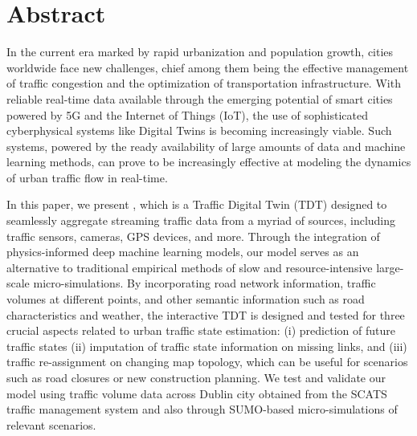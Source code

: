 \newpage
\chapter*{\centering Abstract}
{
In the current era marked by rapid urbanization and population growth, cities worldwide face new challenges, chief among them being the effective management of traffic congestion and the optimization of transportation infrastructure. With reliable real-time data available through the emerging potential of smart cities powered by 5G and the Internet of Things (IoT), the use of sophisticated cyberphysical systems like Digital Twins is becoming increasingly viable. Such systems, powered by the ready availability of large amounts of data and machine learning methods, can prove to be increasingly effective at modeling the dynamics of urban traffic flow in real-time.

In this paper, we present \modelname, which is a Traffic Digital Twin (TDT) designed to seamlessly aggregate streaming traffic data from a myriad of sources, including traffic sensors, cameras, GPS devices, and more. Through the integration of physics-informed deep machine learning models, our model serves as an alternative to traditional empirical methods of slow and resource-intensive large-scale micro-simulations. By incorporating road network information, traffic volumes at different points, and other semantic information such as road characteristics and weather, the interactive TDT is designed and tested for three crucial aspects related to urban traffic state estimation: (i) prediction of future traffic states (ii) imputation of traffic state information on missing links, and (iii) traffic re-assignment on changing map topology, which can be useful for scenarios such as road closures or new construction planning. We test and validate our model using traffic volume data across Dublin city obtained from the SCATS traffic management system and also through SUMO-based micro-simulations of relevant scenarios.
}